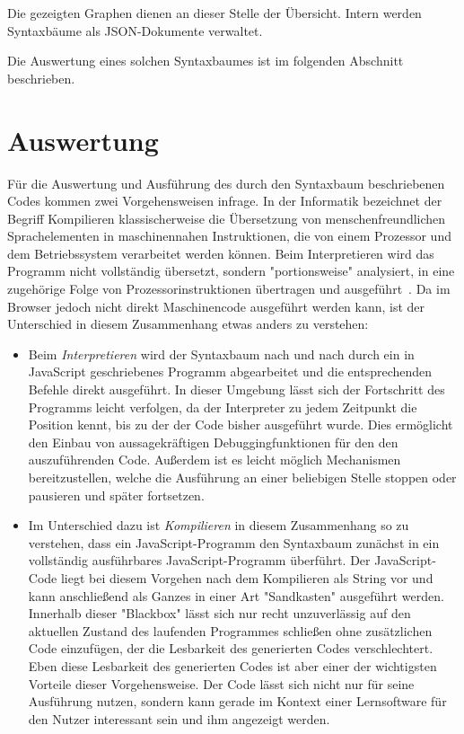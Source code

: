 Die gezeigten Graphen dienen an dieser Stelle der Übersicht. Intern werden Syntaxbäume als JSON-Dokumente verwaltet.

Die Auswertung eines solchen Syntaxbaumes ist im folgenden Abschnitt beschrieben.

\section{Auswertung}
\label{sec:implementation:evaluation}

Für die Auswertung und Ausführung des durch den Syntaxbaum beschriebenen Codes kommen zwei Vorgehensweisen infrage. In der Informatik bezeichnet der Begriff Kompilieren klassischerweise die Übersetzung von menschenfreundlichen Sprachelementen in maschinennahen Instruktionen, die von einem Prozessor und dem Betriebssystem verarbeitet werden können. Beim Interpretieren wird das Programm nicht vollständig übersetzt, sondern "portionsweise" analysiert, in eine zugehörige Folge von Prozessorinstruktionen übertragen und ausgeführt~\cite[47]{wagenknecht2009}. Da im Browser jedoch nicht direkt Maschinencode ausgeführt werden kann, ist der Unterschied in diesem Zusammenhang etwas anders zu verstehen:

\begin{itemize}
  \item Beim \emph{Interpretieren} wird der Syntaxbaum nach und nach durch ein in JavaScript geschriebenes Programm abgearbeitet und die entsprechenden Befehle direkt ausgeführt. In dieser Umgebung lässt sich der Fortschritt des Programms leicht verfolgen, da der Interpreter zu jedem Zeitpunkt die Position kennt, bis zu der der Code bisher ausgeführt wurde. Dies ermöglicht den Einbau von aussagekräftigen Debuggingfunktionen für den den auszuführenden Code. Außerdem ist es leicht möglich Mechanismen bereitzustellen, welche die Ausführung an einer beliebigen Stelle stoppen oder pausieren und später fortsetzen.
  \item Im Unterschied dazu ist \emph{Kompilieren} in diesem Zusammenhang so zu verstehen, dass ein JavaScript-Programm den Syntaxbaum zunächst in ein vollständig ausführbares JavaScript-Programm überführt. Der JavaScript-Code liegt bei diesem Vorgehen nach dem Kompilieren als String vor und kann anschließend als Ganzes in einer Art "Sandkasten" ausgeführt werden. Innerhalb dieser "Blackbox" lässt sich nur recht unzuverlässig auf den aktuellen Zustand des laufenden Programmes schließen ohne zusätzlichen Code einzufügen, der die Lesbarkeit des generierten Codes verschlechtert. Eben diese Lesbarkeit des generierten Codes ist aber einer der wichtigsten Vorteile dieser Vorgehensweise. Der Code lässt sich nicht nur für seine Ausführung nutzen, sondern kann gerade im Kontext einer Lernsoftware für den Nutzer interessant sein und ihm angezeigt werden.
\end{itemize}

